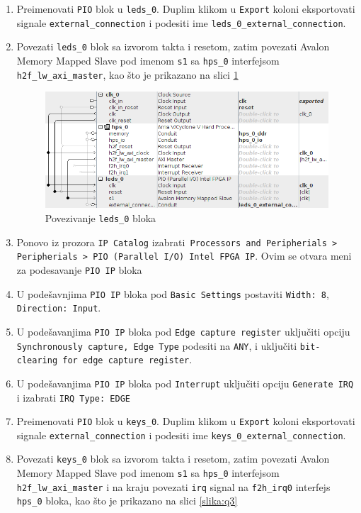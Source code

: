 \begin{enumerate}
\item  Preimenovati \texttt{PIO} blok u \texttt{leds\_0}. Duplim klikom u \texttt{Export} koloni eksportovati signale \texttt{external\_connection} i podesiti ime \texttt{leds\_0\_external\_connection}.
\item  Povezati \texttt{leds\_0} blok sa izvorom takta i resetom, zatim povezati Avalon Memory Mapped Slave pod imenom \texttt{s1} sa \texttt{hps\_0} interfejsom \texttt{h2f\_lw\_axi\_master}, kao što je prikazano na slici \ref{slika:q2}
\begin{figure}[h!]
\centering
\includegraphics[scale=0.9]{img/quartus2.png}
\caption{Povezivanje \texttt{leds\_0} bloka}
\label{slika:q2}
\end{figure}
\item  Ponovo iz prozora \texttt{IP Catalog} izabrati\texttt{ Processors and Peripherials > Peripherials > PIO (Parallel I/O) Intel FPGA IP}. Ovim se otvara meni za podesavanje \texttt{PIO IP} bloka
\item  U podešavnjima \texttt{PIO IP} bloka pod \texttt{Basic Settings} postaviti \texttt{Width: 8}, \texttt{Direction: Input}.
\item  U podešavanjima \texttt{PIO IP} bloka pod \texttt{Edge capture register} uključiti opciju \texttt{Synchronously capture, Edge Type} podesiti na \texttt{ANY}, i uključiti \texttt{bit-clearing for edge capture register}.
\item  U podešavanjima \texttt{PIO IP} bloka pod \texttt{Interrupt} uključiti opciju \texttt{Generate IRQ} i izabrati \texttt{IRQ Type: EDGE}
\item  Preimenovati \texttt{PIO} blok u \texttt{keys\_0}. Duplim klikom u \texttt{Export} koloni eksportovati signale \texttt{external\_connection} i podesiti ime \texttt{keys\_0\_external\_connection}.
\item  Povezati \texttt{keys\_0} blok sa izvorom takta i resetom, zatim povezati Avalon Memory Mapped Slave pod imenom \texttt{s1} sa \texttt{hps\_0} interfejsom  \texttt{h2f\_lw\_axi\_master} i na kraju povezati \texttt{irq} signal na \texttt{f2h\_irq0} interfejs \texttt{hps\_0} bloka, kao što je prikazano na slici \ref{slika:q3}

\end{enumerate}

